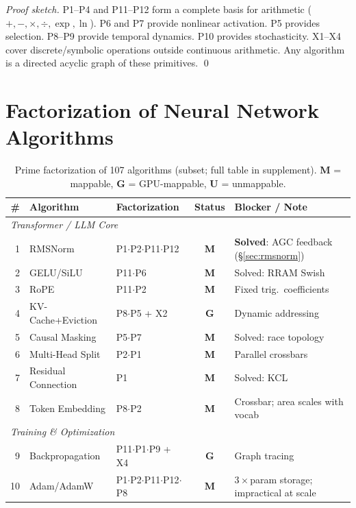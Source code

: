 \documentclass[11pt]{article}
\begin{document}
\begin{proof}[Proof sketch]
P1--P4 and P11--P12 form a complete basis for arithmetic ($+, -, \times, \div, \exp, \ln$). P6 and P7 provide nonlinear activation. P5 provides selection. P8--P9 provide temporal dynamics. P10 provides stochasticity. X1--X4 cover discrete/symbolic operations outside continuous arithmetic. Any algorithm is a directed acyclic graph of these primitives. \qed
\end{proof}

\section{Factorization of Neural Network Algorithms}
\label{sec:factorization}

\begin{table}[t]
\centering
\caption{Prime factorization of 107 algorithms (subset; full table in supplement). \textbf{M} = mappable, \textbf{G} = GPU-mappable, \textbf{U} = unmappable.}
\label{tab:factorizations}
\footnotesize
\begin{tabular}{rllcl}
\toprule
\# & Algorithm & Factorization & Status & Blocker / Note \\
\midrule
\multicolumn{5}{l}{\textit{Transformer / LLM Core}} \\
1 & RMSNorm & P1$\cdot$P2$\cdot$P11$\cdot$P12 & \textbf{M} & \textbf{Solved}: AGC feedback (\S\ref{sec:rmsnorm}) \\
2 & GELU/SiLU & P11$\cdot$P6 & \textbf{M} & Solved: RRAM Swish~\cite{rram_swish2022} \\
3 & RoPE & P11$\cdot$P2 & \textbf{M} & Fixed trig.\ coefficients \\
4 & KV-Cache+Eviction & P8$\cdot$P5 + X2 & \textbf{G} & Dynamic addressing \\
5 & Causal Masking & P5$\cdot$P7 & \textbf{M} & Solved: race topology~\cite{bieg2025} \\
6 & Multi-Head Split & P2$\cdot$P1 & \textbf{M} & Parallel crossbars \\
7 & Residual Connection & P1 & \textbf{M} & Solved: KCL~\cite{bieg2025} \\
8 & Token Embedding & P8$\cdot$P2 & \textbf{M} & Crossbar; area scales with vocab \\
\midrule
\multicolumn{5}{l}{\textit{Training \& Optimization}} \\
9 & Backpropagation & P11$\cdot$P1$\cdot$P9 + X4 & \textbf{G} & Graph tracing \\
10 & Adam/AdamW & P1$\cdot$P2$\cdot$P11$\cdot$P12$\cdot$P8 & \textbf{M} & $3\times$param storage; impractical at scale \\

\end{tabular}
\end{table}
\end{document}
